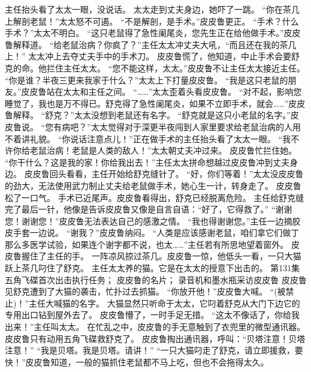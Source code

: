 \documentclass[a4paper,12pt,UTF8,twoside]{ctexbook}
\begin{document}
        主任抬头看了太太一眼，没说话。 
        太太走到丈夫身边，她吓了一跳。 
        “你在茶几上解剖老鼠！”太太怒不可遏。 
        “不是解剖，是手术。”皮皮鲁更正。 
        “手术？什么手术？”太太不明白。 
        “这只老鼠得了急性阑尾炎，您先生正在给他做手术。”皮皮鲁解释道。 
        “给老鼠治病？你疯了？”主任太太冲丈夫大吼，“而且还在我的茶几上！” 
        太太冲上去夺丈夫手中的手术刀。 
        皮皮鲁慌了，他知道，中止手术会要舒克的命。他拦住主任太太。 
        “您不能这样，太太。”皮皮鲁不让主任太太接近主任。 
        “你是谁？半夜三更来我家于什么？”太太上下打量皮皮鲁。 
        “我是这只老鼠的朋友。”皮皮鲁站在太太和主任之间。 
        “……”太太歪着头看皮皮鲁。 
        “对不起，影响您睡觉了，我也是万不得已。舒克得了急性阑尾炎，如果不立即手术，就会……”皮皮鲁解释。 
        “舒克？”太太没想到老鼠还有名字。 
        “舒克就是这只小老鼠的名字。”皮皮鲁说。 
        “您有病吧？”太太觉得对于深更半夜闯到人家里要求给老鼠治病的人用不着讲礼貌。 
        “你说话注意点儿！”正在做手术的主任抬头看了太太一眼。 
        “我不许你给老鼠治病！老鼠是人类的敌人！”太太朝丈夫冲过来。 
        皮皮鲁忙拦住她。 
        “你干什么？这是我的家！你给我出去！”主任太太拼命想越过皮皮鲁冲到丈夫身边。 
        皮皮鲁回头看看，主任开始给舒克缝针了。 
        “好，你们等着！”太太没皮皮鲁的劲大，无法使用武力制止丈夫给老鼠做手术，她心生一计，转身走了。 
        皮皮鲁松了一口气。 
        手术已近尾声。皮皮鲁看得出，舒克已经脱离危险。 
        主任给舒克缝完了最后一针，他像是告诉皮皮鲁又像是自言自语：“好了，它得救了。” 
        “谢谢您！谢谢您！”皮皮鲁无法表达自己的感激之情。 
        “我也得谢谢您。”主任一边摘胶皮手套一边说。 
        “谢我？”皮皮鲁纳闷。 
        “人类是应该感谢老鼠，咱们拿它们做丁那么多医学试验，如果连个谢字都不说，也太……”主任若有所思地望着窗外。 
        皮皮鲁握住了主任的手。 
        一阵凉风掠过茶几。皮皮鲁一惊，他低头一看，一只大猫跃上茶几叼住了舒克。 
        主任太太养的猫。它是在太太的授意下出击的。   第131集 
        五角飞碟首次出击执行任务； 
        皮皮鲁的名片； 
        录音机和墨水瓶采访皮皮鲁   
        皮皮鲁见舒克遭到了大猫的袭击，忙扑过去抓猫。 
        “你放开他！”皮皮鲁大喊。 
        “(被禁止)！”主任大喊猫的名字。 
        大猫显然只听命于太太，它叼着舒克从大门下边它的专用出口钻到屋外去了。 
        皮皮鲁懵了，一时手足无措。 
        “这太不像话了，你给我出来！”主任叫太太。 
        在忙乱之中，皮皮鲁的手无意触到了衣兜里的微型通讯器。 
        皮皮鲁只有动用五角飞碟救舒克了。 
        皮皮鲁掏出通讯器，呼叫：“贝塔注意！贝塔注意！” 
        “我是贝塔。我是贝塔。请讲！” 
        “一只大猫叼走了舒克，请立即援救，要快！”皮皮鲁知道，一般的猫抓住老鼠都不马上吃，但也不会拖得太久。 
\end{document}
